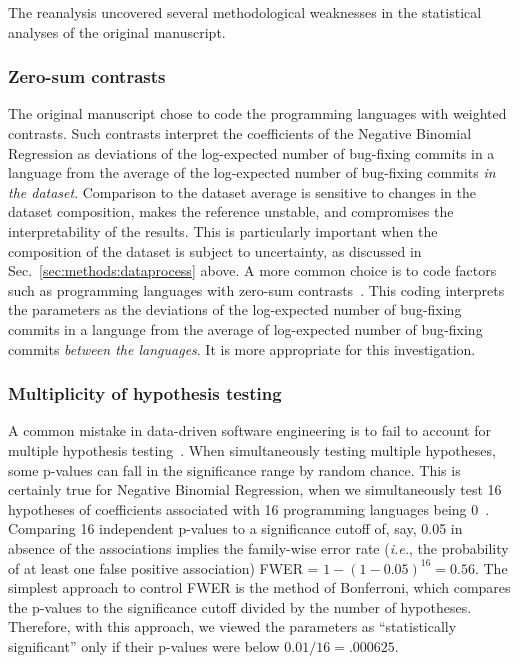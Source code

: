 \documentclass[acmsmall]{acmart}
\newcommand{\ie}{\emph{i.e.}\xspace}
\begin{document}
The reanalysis uncovered several methodological weaknesses in the
statistical analyses of the original manuscript.

\subsubsection{Zero-sum contrasts}\label{sec:zerosum}
The original manuscript chose to code the programming languages with
weighted contrasts.  Such contrasts interpret the coefficients of the
Negative Binomial Regression as deviations of the log-expected number of
bug-fixing commits in a language from the average of the log-expected number
of bug-fixing commits {\it in the dataset}. Comparison to the dataset
average is sensitive to changes in the dataset composition, makes the
reference unstable, and compromises the interpretability of the
results. This is particularly important when the composition of the dataset
is subject to uncertainty, as discussed in
Sec.~\ref{sec:methods:dataprocess} above.  A more common choice is to code
factors such as programming languages with zero-sum
contrasts~\cite{knnl}. This coding interprets the parameters as the
deviations of the log-expected number of bug-fixing commits in a language
from the average of log-expected number of bug-fixing commits {\it between
  the languages}. It is more appropriate for this investigation.

\subsubsection{Multiplicity of hypothesis testing}\label{sec:bonferroni}

A common mistake in data-driven software engineering is to fail to account
for multiple hypothesis testing~\cite{se-errors}. When simultaneously
testing multiple hypotheses, some p-values can fall in the significance
range by random chance. This is certainly true for Negative Binomial
Regression, when we simultaneously test 16 hypotheses of coefficients
associated with 16 programming languages being 0~\cite{knnl}. Comparing 16
independent p-values to a significance cutoff of, say, 0.05 in absence of
the associations implies the family-wise error rate (\ie, the probability
of at least one false positive association) FWER = $1-(1-0.05)^{16}=0.56$. The
simplest approach to control FWER is the method of Bonferroni, which
compares the p-values to the significance cutoff divided by the number of
hypotheses. Therefore, with this approach, we viewed the parameters as
``statistically significant'' only if their p-values were below
$0.01/16=.000625$.
\end{document}
